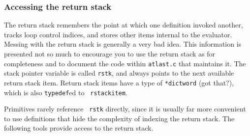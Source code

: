 \documentclass[twocolumn]{article}
\begin{document}
\subsubsection{Accessing the return stack}

The return stack remembers the point at which one definition
invoked another, tracks loop control indices, and stores other items
internal to the evaluator.  Messing with the return stack is generally
a very bad idea.  This information is presented not so much to
encourage you to use the return stack as for completeness and to
document the code within {\tt atlast.c} that maintains it.
The stack pointer variable is called {\tt rstk}, and always points to
the next available return stack item.  Return stack items have a type of
{\tt **dictword} (got that?), which is also {\tt typedef}ed to {\tt
rstackitem}.

Primitives rarely reference {\tt
rstk} directly, since it is usually far more convenient to use
definitions that hide the complexity of indexing the return stack.  The
following tools provide access to the return stack.
\end{document}
